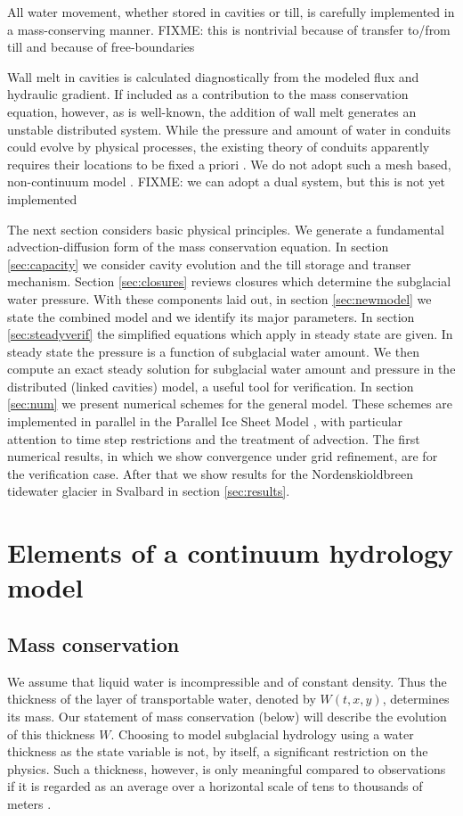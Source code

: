 \documentclass[11pt,final]{amsart}
\begin{document}
All water movement, whether stored in cavities or till, is carefully implemented in a mass-conserving manner.  FIXME: this is nontrivial because of transfer to/from till and because of free-boundaries

Wall melt in cavities is calculated diagnostically from the modeled flux and hydraulic gradient.  If included as a contribution to the mass conservation equation, however, as is well-known, the addition of wall melt generates an unstable distributed system.  While the pressure and amount of water in conduits could evolve by physical processes, the existing theory of conduits apparently requires their locations to be fixed a priori \citep{Hewittetal2012,PimentelFlowers2011,Schoofmeltsupply}.  We do not adopt such a mesh based, non-continuum model \citep[compare][]{Hewittetal2012}.  FIXME: we can adopt a dual system, but this is not yet implemented

The next section considers basic physical principles.  We generate a fundamental advection-diffusion form of the mass conservation equation.  In section \ref{sec:capacity} we consider cavity evolution and the till storage and transer mechanism.  Section \ref{sec:closures} reviews closures which determine the subglacial water pressure.  With these components laid out, in section \ref{sec:newmodel} we state the combined model and we identify its major parameters.  In section \ref{sec:steadyverif} the simplified equations which apply in steady state are given.  In steady state the pressure is a function of subglacial water amount.  We then compute an exact steady solution for subglacial water amount and pressure in the distributed (linked cavities) model, a useful tool for verification.  In section \ref{sec:num} we present numerical schemes for the general model.  These schemes are implemented in parallel in the Parallel Ice Sheet Model \citep{pism-user-manual}, with particular attention to time step restrictions and the treatment of advection.  The first numerical results, in which we show convergence under grid refinement, are for the verification case.  After that we show results for the Nordenskioldbreen tidewater glacier in Svalbard in section \ref{sec:results}.


\section{Elements of a continuum hydrology model} \label{sec:elements}

\subsection*{Mass conservation}  We assume that liquid water is incompressible and of constant density.  Thus the thickness of the layer of transportable water, denoted by $W(t,x,y)$, determines its mass.  Our statement of mass conservation (below) will describe the evolution of this thickness $W$.  Choosing to model subglacial hydrology using a water thickness as the state variable is not, by itself, a significant restriction on the physics.  Such a thickness, however, is only meaningful compared to observations if it is regarded as an average over a horizontal scale of tens to thousands of meters \citep{FlowersClarke2002_theory}.
\end{document}
